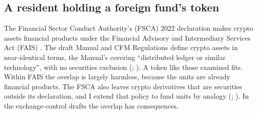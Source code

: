 \documentclass[12pt,a4paper]{article}
\begin{document}
\subsection{A resident holding a foreign fund's token}\label{sec:sa_class}
The Financial Sector Conduct Authority's (FSCA) 2022 declaration makes crypto assets financial products under the Financial Advisory and Intermediary Services Act (FAIS) \citep[cls~1--2, p.~3]{FSCA2022}. The draft Manual and CFM Regulations define crypto assets in near-identical terms, the Manual's covering ``distributed ledger or similar technology'', with no securities exclusion (\citealp[A.1, p.~7]{SARB2026CryptoManual}; \citealp[reg~1(1), p.~2]{NT2026CFMDraft}). A token like those examined fits. Within FAIS the overlap is largely harmless, because the units are already financial products. The FSCA also leaves crypto derivatives that are securities outside its declaration, and I extend that policy to fund units by analogy (\citealp[p.~4 n.~2; paras~4.10--4.12, p.~10]{FSCA2022Policy}; \citealp[s~1, PDF p.~5]{FAIS2002}). In the exchange-control drafts the overlap has consequences.
\end{document}
